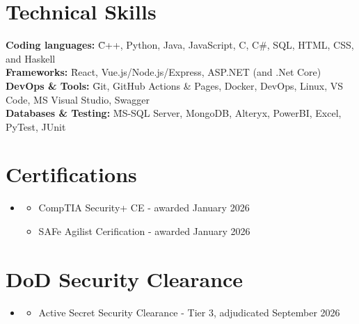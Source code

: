 \documentclass[letterpaper,11pt]{article}
\newcommand{\cvitem}[1]{
  \item\small{
    {#1\vspace{-2pt}}
  }
}
\newcommand{\cvheadingstart}{\begin{itemize}[leftmargin=0in, label={}]}
\newcommand{\cvheadingend}{\end{itemize}}
\newcommand{\cvitemstart}{\begin{itemize}\justifying}
\newcommand{\cvitemend}{\end{itemize}\vspace{-5pt}}
\begin{document}
\section{Technical Skills}
\begin{tabbing}
\hspace{0.25cm} \= \textbf{Coding languages:} \= C++, Python, Java, JavaScript, C, C\#, SQL, HTML, CSS, and Haskell \\
\> \textbf{Frameworks:} \= React, Vue.js/Node.js/Express, ASP.NET (and .Net Core) \\
\> \textbf{DevOps \& Tools:} \= Git, GitHub Actions \& Pages, Docker, DevOps, Linux, VS Code, MS Visual Studio, Swagger \\
\> \textbf{Databases \& Testing:} \= MS-SQL Server, MongoDB, Alteryx, PowerBI, Excel, PyTest, JUnit
\end{tabbing}

\section{Certifications}
\cvheadingstart
\item
\cvitemstart

\cvitem{CompTIA Security+ CE - awarded January 2026}
\cvitem{SAFe Agilist Cerification - awarded January 2026}
\cvitemend



\cvheadingend
\section{DoD Security Clearance}
\cvheadingstart
\item
\cvitemstart

\cvitem{Active Secret Security Clearance - Tier 3, adjudicated September 2026}
\cvitemend
\cvheadingend
\end{document}
